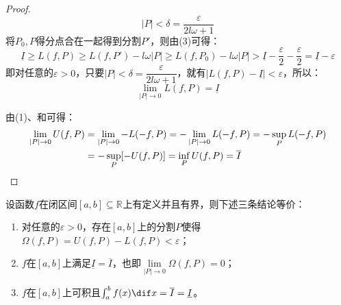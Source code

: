 \begin{proof}
\begin{equation*}
		|P|<\delta=\frac{\varepsilon}{2l\omega+1}
	\end{equation*}
	将$P_0,P$得分点合在一起得到分割$P'$，则由(3)可得：
	\begin{equation*}
		\underline{I}\geqslant L(f,P)\geqslant L(f,P')-l\omega|P|\geqslant L(f,P_0)-l\omega|P|>\underline{I}-\frac{\varepsilon}{2}-\frac{\varepsilon}{2}=\underline{I}-\varepsilon
	\end{equation*}
	即对任意的$\varepsilon>0$，只要$|P|<\delta=\dfrac{\varepsilon}{2l\omega+1}$，就有$|L(f,P)-\underline{I}|<\varepsilon$，所以：
	\begin{equation*}
		\lim_{|P|\to0}L(f,P)=\underline{I}
	\end{equation*}\par
	由(1)、和可得：
	\begin{align*}
		\lim_{|P|\to0}U(f,P)&=\lim_{|P|\to0}-L(-f,P)=-\lim_{|P|\to0}L(-f,P)=-\sup_PL(-f,P) \\
		&=-\sup_P[-U(f,P)]=\inf_PU(f,P)=\overline{I}\qedhere
	\end{align*}
\end{proof}
\begin{theorem}\label{theo:RiemannIntegrableIff}
	设函数$f$在闭区间$[a,b]\subseteq\mathbb{R}^{}$上有定义并且有界，则下述三条结论等价：
	\begin{enumerate}
		\item 对任意的$\varepsilon>0$，存在$[a,b]$上的分割$P$使得$\Omega(f,P)=U(f,P)-L(f,P)<\varepsilon$；
		\item $f$在$[a,b]$上满足$\underline{I}=\overline{I}$，也即$\lim\limits_{|P|\to0}\Omega(f,P)=0$；
		\item $f$在$[a,b]$上可积且$\int_{a}^{b}f(x)\dif x=\overline{I}=\underline{I}$。
	\end{enumerate}
\end{theorem}
